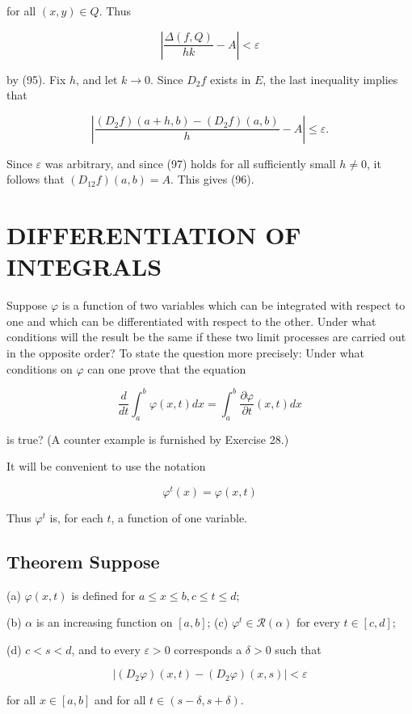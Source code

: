 \documentclass[10pt]{article}
\begin{document}
for all $(x, y) \in Q$. Thus

$$
\left|\frac{\Delta(f, Q)}{h k}-A\right|<\varepsilon
$$

by (95). Fix $h$, and let $k \rightarrow 0$. Since $D_{2} f$ exists in $E$, the last inequality implies that

$$
\left|\frac{\left(D_{2} f\right)(a+h, b)-\left(D_{2} f\right)(a, b)}{h}-A\right| \leq \varepsilon .
$$

Since $\varepsilon$ was arbitrary, and since (97) holds for all sufficiently small $h \neq 0$, it follows that $\left(D_{12} f\right)(a, b)=A$. This gives (96).

\section{DIFFERENTIATION OF INTEGRALS}
Suppose $\varphi$ is a function of two variables which can be integrated with respect to one and which can be differentiated with respect to the other. Under what conditions will the result be the same if these two limit processes are carried out in the opposite order? To state the question more precisely: Under what conditions on $\varphi$ can one prove that the equation

$$
\frac{d}{d t} \int_{a}^{b} \varphi(x, t) d x=\int_{a}^{b} \frac{\partial \varphi}{\partial t}(x, t) d x
$$

is true? (A counter example is furnished by Exercise 28.)

It will be convenient to use the notation

$$
\varphi^{t}(x)=\varphi(x, t)
$$

Thus $\varphi^{t}$ is, for each $t$, a function of one variable.

\subsection{Theorem Suppose}
(a) $\varphi(x, t)$ is defined for $a \leq x \leq b, c \leq t \leq d$;

(b) $\alpha$ is an increasing function on $[a, b]$; (c) $\varphi^{t} \in \mathscr{R}(\alpha)$ for every $t \in[c, d]$;

(d) $c<s<d$, and to every $\varepsilon>0$ corresponds a $\delta>0$ such that

$$
\left|\left(D_{2} \varphi\right)(x, t)-\left(D_{2} \varphi\right)(x, s)\right|<\varepsilon
$$

for all $x \in[a, b]$ and for all $t \in(s-\delta, s+\delta)$.
\end{document}
